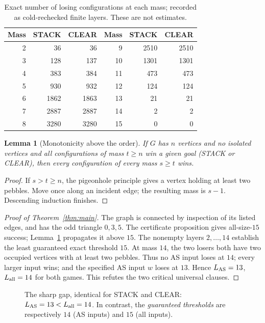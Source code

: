 \documentclass[11pt,a4paper]{article}
\newtheorem{lemma}[theorem]{Lemma}
\begin{document}
\begin{table}[H]\centering\small
\begin{tabular}{r rr@{\quad}r rr}\toprule
Mass & STACK & CLEAR & Mass & STACK & CLEAR\\\midrule
2&36&36&9&2510&2510\\
3&128&137&10&1301&1301\\
4&383&384&11&473&473\\
5&930&932&12&124&124\\
6&1862&1863&13&21&21\\
7&2887&2887&14&2&2\\
8&3280&3280&15&0&0\\\bottomrule
\end{tabular}
\caption{Exact number of losing configurations at each mass; recorded as cold-rechecked finite layers. These are not estimates.}\label{tab:counts}
\end{table}
\begin{lemma}[Monotonicity above the order]\label{lem:monotonic}
If \(G\) has \(n\) vertices and no isolated vertices and all configurations of mass \(t\ge n\) win a given goal (STACK or CLEAR), then every configuration of every mass \(s\ge t\) wins.
\end{lemma}
\begin{proof}
If \(s>t\ge n\), the pigeonhole principle gives a vertex holding at least two pebbles. Move once along an incident edge; the resulting mass is \(s-1\). Descending induction finishes.
\end{proof}
\begin{proof}[Proof of Theorem~\ref{thm:main}]
The graph is connected by inspection of its listed edges, and has the odd triangle \(0,3,5\). The certificate proposition gives all-size-\(15\) success; Lemma~\ref{lem:monotonic} propagates it above \(15\). The nonempty layers \(2,\ldots,14\) establish the least guaranteed exact threshold \(15\). At mass \(14\), the two losers both have two occupied vertices with at least two pebbles. Thus no AS input loses at \(14\); every larger input wins; and the specified AS input \(w\) loses at \(13\). Hence \(L_{\rm AS}=13\), \(L_{\rm all}=14\) for both games. This refutes the two critical universal clauses.
\end{proof}
\begin{figure}[H]\centering
{}
\caption{The sharp gap, identical for STACK and CLEAR: \(L_{\rm AS}=13<L_{\rm all}=14\). In contrast, the \emph{guaranteed thresholds} are respectively \(14\) (AS inputs) and \(15\) (all inputs).}\label{fig:gap}
\end{figure}
\end{document}
